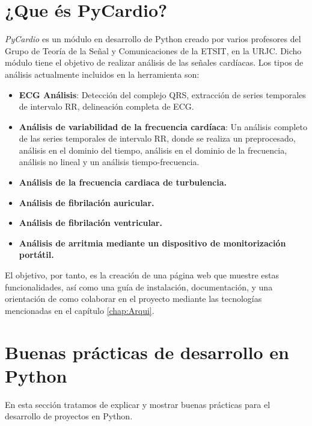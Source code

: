 \section{¿Que és PyCardio?}
\label{sec:explainPyCardio}
\emph{PyCardio} es un módulo en desarrollo  de Python creado por varios profesores del Grupo de Teoría de la Señal y Comunicaciones de la ETSIT, en la URJC. Dicho módulo tiene el objetivo de realizar análisis de las señales cardíacas. Los tipos de análisis actualmente incluidos en la herramienta son:
\begin{itemize}
    \item \textbf{ECG Análisis}: Detección del complejo QRS, extracción de series temporales de intervalo RR, delineación completa de ECG.
    \item \textbf{Análisis de variabilidad de la frecuencia cardíaca}: Un análisis completo de las series temporales de intervalo RR, donde se realiza un preprocesado, análisis en  el dominio del tiempo, análisis en el dominio de la frecuencia, análisis no lineal y un análisis tiempo-frecuencia.
    \item \textbf{Análisis de la frecuencia cardiaca de turbulencia.}
    \item \textbf{Análisis de fibrilación auricular.}
    \item \textbf{Análisis de fibrilación ventricular.}
    \item \textbf{Análisis de arritmia mediante un dispositivo de monitorización portátil.}
\end{itemize}

El objetivo, por tanto, es la creación de una página web que muestre estas funcionalidades, así como una guía de instalación, documentación, y una orientación de como colaborar en el proyecto mediante las tecnologías mencionadas en el capítulo \ref{chap:Arqui}.

\section{Buenas prácticas de desarrollo en Python}
\label{subsec:bestPracticses}
En esta sección tratamos de explicar y mostrar buenas prácticas para el desarrollo de proyectos en Python.\\


